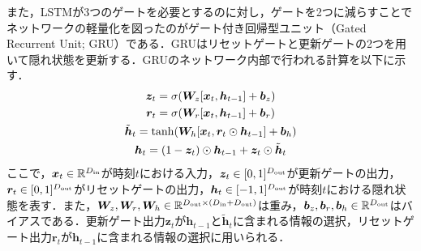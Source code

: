 \documentclass[12pt]{jarticle}
\numberwithin{equation}{section}    %
\numberwithin{figure}{section}      %
\numberwithin{table}{section}      %
\begin{document}
また，LSTMが3つのゲートを必要とするのに対し，ゲートを2つに減らすことでネットワークの軽量化を図ったのがゲート付き回帰型ユニット（Gated Recurrent Unit; GRU）\cite{cho2014learning}である．GRUはリセットゲートと更新ゲートの2つを用いて隠れ状態を更新する．GRUのネットワーク内部で行われる計算を以下に示す．
\begin{gather}
    \bm{z}_{t} = \sigma(\bm{W}_{z}[\bm{x}_{t}, \bm{h}_{t-1}] + \bm{b}_{z}) \\
    \bm{r}_{t} = \sigma(\bm{W}_{r}[\bm{x}_{t}, \bm{h}_{t-1}] + \bm{b}_{r}) \\
    \tilde{\bm{h}}_{t} = \tanh(\bm{W}_{h}[\bm{x}_{t}, \bm{r}_{t} \odot \bm{h}_{t-1}] + \bm{b}_{h}) \\
    \bm{h}_{t} = (1 - \bm{z}_{t}) \odot \bm{h}_{t-1} + \bm{z}_{t} \odot \tilde{\bm{h}}_{t}
\end{gather}
ここで，$\bm{x}_{t} \in \mathbb{R}^{D_{\text{in}}}$が時刻$t$における入力，$\bm{z}_{t} \in [0, 1]^{D_{\text{out}}}$が更新ゲートの出力，$\bm{r}_{t} \in [0, 1]^{D_{\text{out}}}$がリセットゲートの出力，$\bm{h}_{t} \in [-1, 1]^{D_{\text{out}}}$が時刻$t$における隠れ状態を表す．また，$\bm{W}_{z}, \bm{W}_{r}, \bm{W}_{h} \in \mathbb{R}^{D_{\text{out}} \times (D_{\text{in}} + D_{\text{out}})}$は重み，$\bm{b}_{z}, \bm{b}_{r}, \bm{b}_{h} \in \mathbb{R}^{D_{\text{out}}}$はバイアスである．更新ゲート出力$\bm{z}_{t}$が$\bm{h}_{t - 1}$と$\tilde{\bm{h}}_{t}$に含まれる情報の選択，リセットゲート出力$\bm{r}_{t}$が$\bm{h}_{t - 1}$に含まれる情報の選択に用いられる．
\end{document}
